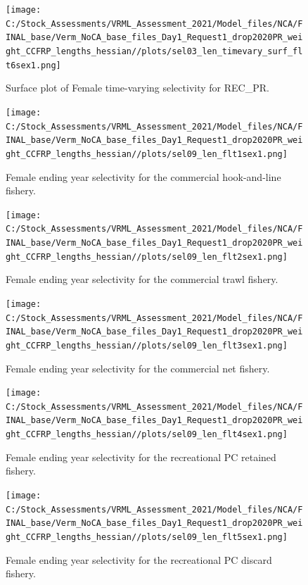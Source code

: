 \documentclass[11pt,
  english,
]{article}
\begin{document}
\begin{figure}
\centering
\texttt{[image: C:/Stock\_Assessments/VRML\_Assessment\_2021/Model\_files/NCA/FINAL\_base/Verm\_NoCA\_base\_files\_Day1\_Request1\_drop2020PR\_weight\_CCFRP\_lengths\_hessian//plots/sel03\_len\_timevary\_surf\_flt6sex1.png]}
\caption{Surface plot of Female time-varying selectivity for REC\_PR.\label{fig:sel03_len_timevary_surf_flt6sex1}}
\end{figure}

\FloatBarrier

\FloatBarrier

\begin{figure}
\centering
\texttt{[image: C:/Stock\_Assessments/VRML\_Assessment\_2021/Model\_files/NCA/FINAL\_base/Verm\_NoCA\_base\_files\_Day1\_Request1\_drop2020PR\_weight\_CCFRP\_lengths\_hessian//plots/sel09\_len\_flt1sex1.png]}
\caption{Female ending year selectivity for the commercial hook-and-line fishery.\label{fig:endyr-selex-COM-HKL}}
\end{figure}

\begin{figure}
\centering
\texttt{[image: C:/Stock\_Assessments/VRML\_Assessment\_2021/Model\_files/NCA/FINAL\_base/Verm\_NoCA\_base\_files\_Day1\_Request1\_drop2020PR\_weight\_CCFRP\_lengths\_hessian//plots/sel09\_len\_flt2sex1.png]}
\caption{Female ending year selectivity for the commercial trawl fishery.\label{fig:endyr-selex-COM-TWL}}
\end{figure}

\begin{figure}
\centering
\texttt{[image: C:/Stock\_Assessments/VRML\_Assessment\_2021/Model\_files/NCA/FINAL\_base/Verm\_NoCA\_base\_files\_Day1\_Request1\_drop2020PR\_weight\_CCFRP\_lengths\_hessian//plots/sel09\_len\_flt3sex1.png]}
\caption{Female ending year selectivity for the commercial net fishery.\label{fig:endyr-selex-COM-NET}}
\end{figure}

\begin{figure}
\centering
\texttt{[image: C:/Stock\_Assessments/VRML\_Assessment\_2021/Model\_files/NCA/FINAL\_base/Verm\_NoCA\_base\_files\_Day1\_Request1\_drop2020PR\_weight\_CCFRP\_lengths\_hessian//plots/sel09\_len\_flt4sex1.png]}
\caption{Female ending year selectivity for the recreational PC retained fishery.\label{fig:endyr-selex-REC-PC}}
\end{figure}

\begin{figure}
\centering
\texttt{[image: C:/Stock\_Assessments/VRML\_Assessment\_2021/Model\_files/NCA/FINAL\_base/Verm\_NoCA\_base\_files\_Day1\_Request1\_drop2020PR\_weight\_CCFRP\_lengths\_hessian//plots/sel09\_len\_flt5sex1.png]}
\caption{Female ending year selectivity for the recreational PC discard fishery.\label{fig:endyr-selex-REC-PC-DIS}}
\end{figure}
\end{document}
